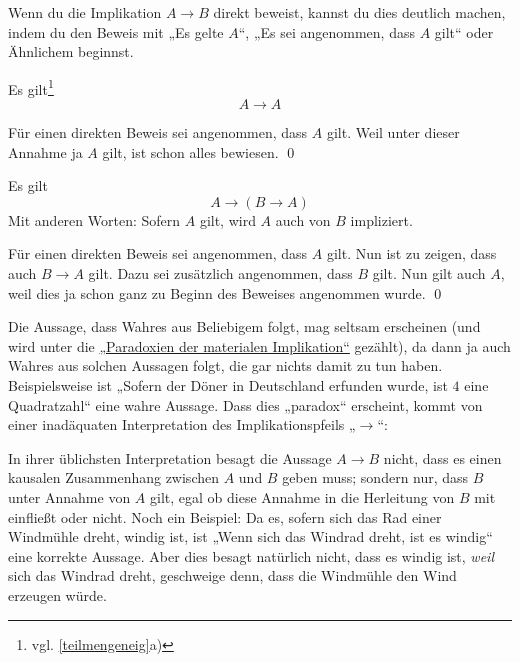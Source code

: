   
\begin{bem}[Signalwörter]
    Wenn du die Implikation $A\to B$ direkt beweist, kannst du dies deutlich machen, indem du den Beweis mit „Es gelte $A$“, „Es sei angenommen, dass $A$ gilt“ oder Ähnlichem beginnst.
\end{bem}

  
\begin{satz} \label{implikationref}
    Es gilt\footnote{vgl. \cref{teilmengeneig}a)}
    \[ A\to A \]
\end{satz}


\begin{bew}
    Für einen direkten Beweis sei angenommen, dass $A$ gilt. Weil unter dieser Annahme ja $A$ gilt, ist schon alles bewiesen. \qed
\end{bew}

  
\begin{satz}\label{wahresausbeliebigem}
    Es gilt
        \[ A \to (B\to A)   \]
    Mit anderen Worten: Sofern $A$ gilt, wird $A$ auch von $B$ impliziert.
\end{satz}


\begin{bew}
    Für einen direkten Beweis sei angenommen, dass $A$ gilt. Nun ist zu zeigen, dass auch $B\to A$ gilt. Dazu sei zusätzlich angenommen, dass $B$ gilt. Nun gilt auch $A$, weil dies ja schon ganz zu Beginn des Beweises angenommen wurde. \qed
\end{bew}


\begin{bem}
    Die Aussage, dass Wahres aus Beliebigem folgt, mag seltsam erscheinen (und wird unter die \href{https://de.wikipedia.org/wiki/Paradoxien_der_materialen_Implikation}{„Paradoxien der materialen Implikation“} gezählt), da dann ja auch Wahres aus solchen Aussagen folgt, die gar nichts damit zu tun haben. Beispielsweise ist „Sofern der Döner in Deutschland erfunden wurde, ist $4$ eine Quadratzahl“ eine wahre Aussage. Dass dies „paradox“ erscheint, kommt von einer inadäquaten Interpretation des Implikationspfeils „$\to$“:
    
    In ihrer üblichsten Interpretation besagt die Aussage $A\to B$ nicht, dass es einen kausalen Zusammenhang zwischen $A$ und $B$ geben muss; sondern nur, dass $B$ unter Annahme von $A$ gilt, egal ob diese Annahme in die Herleitung von $B$ mit einfließt oder nicht. Noch ein Beispiel: Da es, sofern sich das Rad einer Windmühle dreht, windig ist, ist „Wenn sich das Windrad dreht, ist es windig“ eine korrekte Aussage. Aber dies besagt natürlich nicht, dass es windig ist, \emph{weil} sich das Windrad dreht, geschweige denn, dass die Windmühle den Wind erzeugen würde.
\end{bem}


